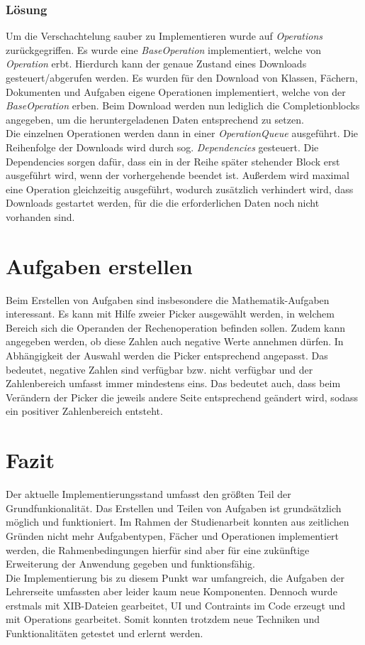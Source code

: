 \subsubsection{Lösung}
Um die Verschachtelung sauber zu Implementieren wurde auf \textit{Operations} zurückgegriffen. Es wurde eine \textit{BaseOperation} implementiert, welche von \textit{Operation} erbt. Hierdurch kann der genaue Zustand eines Downloads gesteuert/abgerufen werden.
Es wurden für den Download von Klassen, Fächern, Dokumenten und Aufgaben eigene Operationen implementiert, welche von der \textit{BaseOperation} erben.
Beim Download werden nun lediglich die Completionblocks angegeben, um die heruntergeladenen Daten entsprechend zu setzen. 
\\Die einzelnen Operationen werden dann in einer \textit{OperationQueue} ausgeführt. Die Reihenfolge der Downloads wird durch sog. \textit{Dependencies} gesteuert. Die Dependencies sorgen dafür, dass ein in der Reihe später stehender Block erst ausgeführt wird, wenn der vorhergehende beendet ist. Außerdem wird maximal eine Operation gleichzeitig ausgeführt, wodurch zusätzlich verhindert wird, dass Downloads gestartet werden, für die die erforderlichen Daten noch nicht vorhanden sind.

\section{Aufgaben erstellen}
Beim Erstellen von Aufgaben sind insbesondere die Mathematik-Aufgaben interessant. Es kann mit Hilfe zweier Picker ausgewählt werden, in welchem Bereich sich die Operanden der Rechenoperation befinden sollen. Zudem kann angegeben werden, ob diese Zahlen auch negative Werte annehmen dürfen. In Abhängigkeit der Auswahl werden die Picker entsprechend angepasst. Das bedeutet, negative Zahlen sind verfügbar bzw. nicht verfügbar und der Zahlenbereich umfasst immer mindestens eins. Das bedeutet auch, dass beim Verändern der Picker die jeweils andere Seite entsprechend geändert wird, sodass ein positiver Zahlenbereich entsteht.

\section{Fazit}
Der aktuelle Implementierungsstand umfasst den größten Teil der Grundfunkionalität. Das Erstellen und Teilen von Aufgaben ist grundsätzlich möglich und funktioniert. Im Rahmen der Studienarbeit konnten aus zeitlichen Gründen nicht mehr Aufgabentypen, Fächer und Operationen implementiert werden, die Rahmenbedingungen hierfür sind aber für eine zukünftige Erweiterung der Anwendung gegeben und funktionsfähig.
\\Die Implementierung bis zu diesem Punkt war umfangreich, die Aufgaben der Lehrerseite umfassten aber leider kaum neue Komponenten. Dennoch wurde erstmals mit XIB-Dateien gearbeitet, UI und Contraints im Code erzeugt und mit Operations gearbeitet. Somit konnten trotzdem neue Techniken und Funktionalitäten getestet und erlernt werden.
